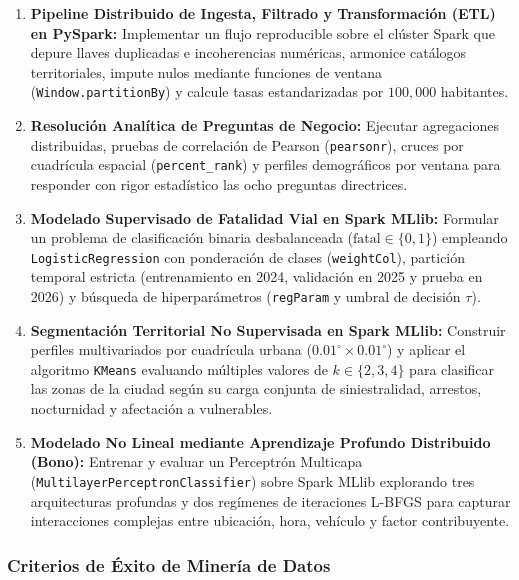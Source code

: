 \begin{enumerate}
    \item \textbf{Pipeline Distribuido de Ingesta, Filtrado y Transformación (ETL) en PySpark:} Implementar un flujo reproducible sobre el clúster Spark que depure llaves duplicadas e incoherencias numéricas, armonice catálogos territoriales, impute nulos mediante funciones de ventana (\texttt{Window.partitionBy}) y calcule tasas estandarizadas por $100,000$ habitantes.
    \item \textbf{Resolución Analítica de Preguntas de Negocio:} Ejecutar agregaciones distribuidas, pruebas de correlación de Pearson (\texttt{pearsonr}), cruces por cuadrícula espacial (\texttt{percent\_rank}) y perfiles demográficos por ventana para responder con rigor estadístico las ocho preguntas directrices.
    \item \textbf{Modelado Supervisado de Fatalidad Vial en Spark MLlib:} Formular un problema de clasificación binaria desbalanceada ($\text{fatal} \in \{0, 1\}$) empleando \texttt{LogisticRegression} con ponderación de clases (\texttt{weightCol}), partición temporal estricta (entrenamiento en 2024, validación en 2025 y prueba en 2026) y búsqueda de hiperparámetros (\texttt{regParam} y umbral de decisión $\tau$).
    \item \textbf{Segmentación Territorial No Supervisada en Spark MLlib:} Construir perfiles multivariados por cuadrícula urbana ($0.01^\circ \times 0.01^\circ$) y aplicar el algoritmo \texttt{KMeans} evaluando múltiples valores de $k \in \{2, 3, 4\}$ para clasificar las zonas de la ciudad según su carga conjunta de siniestralidad, arrestos, nocturnidad y afectación a vulnerables.
    \item \textbf{Modelado No Lineal mediante Aprendizaje Profundo Distribuido (Bono):} Entrenar y evaluar un Perceptrón Multicapa (\texttt{MultilayerPerceptronClassifier}) sobre Spark MLlib explorando tres arquitecturas profundas y dos regímenes de iteraciones L-BFGS para capturar interacciones complejas entre ubicación, hora, vehículo y factor contribuyente.
\end{enumerate}

\subsubsection{Criterios de Éxito de Minería de Datos}

